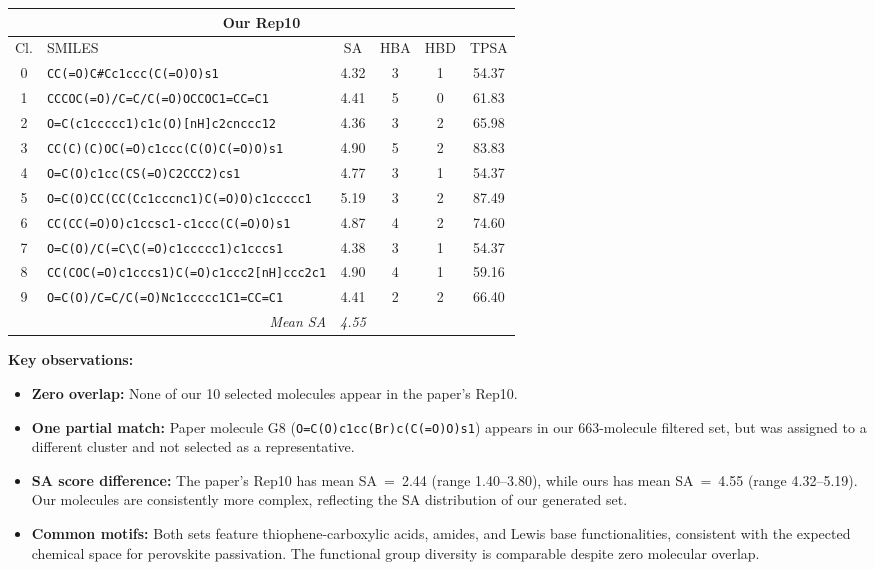 \documentclass[11pt,a4paper]{article}
\begin{document}
\begin{table}[H]
\begin{tabular}{clcccc}
\toprule
\multicolumn{6}{c}{\textbf{Our Rep10}} \\
\midrule
Cl. & SMILES & SA & HBA & HBD & TPSA \\
\midrule
0 & \texttt{CC(=O)C\#Cc1ccc(C(=O)O)s1} & 4.32 & 3 & 1 & 54.37 \\
1 & \texttt{CCCOC(=O)/C=C/C(=O)OCCOC1=CC=C1} & 4.41 & 5 & 0 & 61.83 \\
2 & \texttt{O=C(c1ccccc1)c1c(O)[nH]c2cnccc12} & 4.36 & 3 & 2 & 65.98 \\
3 & \texttt{CC(C)(C)OC(=O)c1ccc(C(O)C(=O)O)s1} & 4.90 & 5 & 2 & 83.83 \\
4 & \texttt{O=C(O)c1cc(CS(=O)C2CCC2)cs1} & 4.77 & 3 & 1 & 54.37 \\
5 & \texttt{O=C(O)CC(CC(Cc1cccnc1)C(=O)O)c1ccccc1} & 5.19 & 3 & 2 & 87.49 \\
6 & \texttt{CC(CC(=O)O)c1ccsc1-c1ccc(C(=O)O)s1} & 4.87 & 4 & 2 & 74.60 \\
7 & \texttt{O=C(O)/C(=C\textbackslash C(=O)c1ccccc1)c1cccs1} & 4.38 & 3 & 1 & 54.37 \\
8 & \texttt{CC(COC(=O)c1cccs1)C(=O)c1ccc2[nH]ccc2c1} & 4.90 & 4 & 1 & 59.16 \\
9 & \texttt{O=C(O)/C=C/C(=O)Nc1ccccc1C1=CC=C1} & 4.41 & 2 & 2 & 66.40 \\
\midrule
\multicolumn{2}{r}{\textit{Mean SA}} & \textit{4.55} & & & \\
\bottomrule
\end{tabular}
\end{table}

\textbf{Key observations:}
\begin{itemize}[nosep]
    \item \textbf{Zero overlap:} None of our 10 selected molecules appear in the paper's Rep10.
    \item \textbf{One partial match:} Paper molecule G8 (\texttt{O=C(O)c1cc(Br)c(C(=O)O)s1}) appears in our 663-molecule filtered set, but was assigned to a different cluster and not selected as a representative.
    \item \textbf{SA score difference:} The paper's Rep10 has mean SA~=~2.44 (range 1.40--3.80), while ours has mean SA~=~4.55 (range 4.32--5.19). Our molecules are consistently more complex, reflecting the SA distribution of our generated set.
    \item \textbf{Common motifs:} Both sets feature thiophene-carboxylic acids, amides, and Lewis base functionalities, consistent with the expected chemical space for perovskite passivation. The functional group diversity is comparable despite zero molecular overlap.
\end{itemize}
\end{document}
